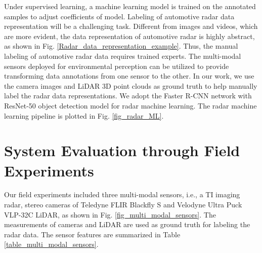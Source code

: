 \documentclass[conference]{IEEEtran}
\begin{document}
Under supervised learning, a machine learning model is trained on the annotated samples to adjust coefficients of model. Labeling of automotive radar data representation will be a challenging task. Different from images and videos, which are more evident, the data representation of automotive radar is highly abstract, as shown in Fig. \ref{Radar_data_representation_example}. Thus, the manual labeling of automotive radar data requires trained experts. The multi-modal sensors deployed for environmental perception can be utilized to provide transforming data annotations from one sensor to the other. 
In our work, we use the camera images and LiDAR 3D point clouds as ground truth to help manually label the radar data representations. We adopt the Faster R-CNN network \cite{ren2016faster}  with ResNet-50 object detection model for radar machine learning. The radar machine learning pipeline is plotted in Fig. \ref{fig_radar_ML}.




\section{System Evaluation through Field Experiments}
Our field experiments included three multi-modal sensors, i.e., a TI imaging radar, stereo cameras of Teledyne FLIR Blackfly S and Velodyne Ultra Puck VLP-32C LiDAR, as shown in Fig. \ref{fig_multi_modal_sensors}. The measurements of cameras and LiDAR are used as ground truth for labeling the radar data. The sensor features are summarized in Table \ref{table_multi_modal_sensors}. 
\begin{table}[h]
\centering
{}
\vspace{0mm}
\caption{Multi-Modal Sensors }
\label{table_multi_modal_sensors}
\vspace{-4mm}
\end{table}
\vspace{-3mm}
\end{document}
